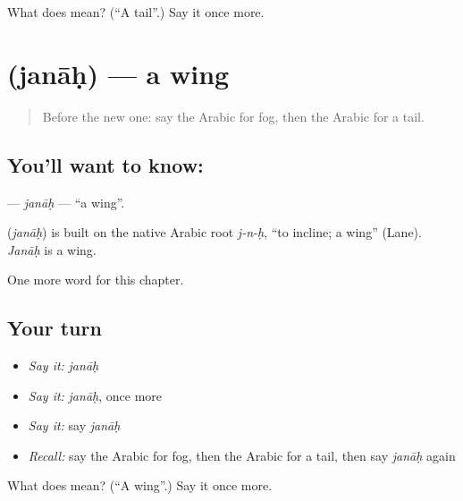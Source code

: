\begin{tcolorbox}[breakable,colback=teal!4,colframe=teal!35!black,title={Before you move on}]
What does  mean? (\textquotedblleft{}A tail\textquotedblright{}.) Say it once more.
\end{tcolorbox}
\section[\texorpdfstring{\ar{جناح} (janāḥ)}{جناح (janāḥ)}]{ (janāḥ) — a wing}

\label{lesson:AR-C217-janah}



\begin{quote}
Before the new one: say the Arabic for fog, then the Arabic for a tail.
\end{quote}

\subsection*{You'll want to know: }
\textbf{} — \emph{janāḥ} — \textquotedblleft{}a wing\textquotedblright{}.

\begin{cousinweb}
\textbf{} (\emph{janāḥ}) is built on the native Arabic root \emph{j-n-ḥ}, \textquotedblleft{}to incline; a wing\textquotedblright{} (Lane). \emph{Janāḥ} is a wing.
\end{cousinweb}

\begin{grammarlens}[title={What you've built}]
One more word for this chapter.
\end{grammarlens}

\subsection*{Your turn}
\begin{itemize}
\raggedright
  \item \emph{Say it:} \emph{janāḥ}
  \item \emph{Say it:} \emph{janāḥ}, once more
  \item \emph{Say it:} say \emph{janāḥ}
  \item \emph{Recall:} say the Arabic for fog, then the Arabic for a tail, then say \emph{janāḥ} again
\end{itemize}

\begin{tcolorbox}[breakable,colback=teal!4,colframe=teal!35!black,title={Before you move on}]
What does  mean? (\textquotedblleft{}A wing\textquotedblright{}.) Say it once more.
\end{tcolorbox}
